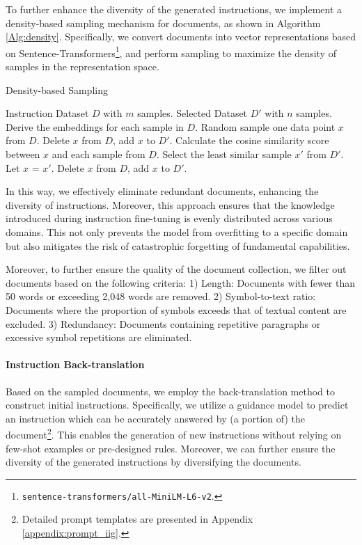 To further enhance the diversity of the generated instructions, we implement a density-based sampling mechanism for documents, as shown in Algorithm \ref{Alg:density}. Specifically, we convert documents into vector representations based on Sentence-Transformers\footnote{\texttt{sentence-transformers/all-MiniLM-L6-v2}.}, and perform sampling to maximize the density of samples in the representation space.

\begin{algorithm}[t]
  \renewcommand{\algorithmicrequire}{\textbf{Input:}}
  \renewcommand{\algorithmicensure}{\textbf{Output:}}
  \caption{Density-based Sampling}
  \label{alg:1}
  \begin{algorithmic}[1]
      \REQUIRE Instruction Dataset $D$ with $m$ samples.
      \ENSURE Selected Dataset $D'$ with $n$ samples.
      \STATE Derive the embeddings for each sample in $D$.
      \STATE Random sample one data point $x$ from $D$.
      \STATE Delete $x$ from $D$, add $x$ to $D'$.
          \STATE Calculate the cosine similarity score between $x$ and each sample from $D$.
          \STATE Select the least similar sample $x'$ from $D'$.
          \STATE Let $x$ = $x'$.
          \STATE Delete $x$ from $D$, add $x$ to $D'$. 
      \ENDFOR
  \end{algorithmic}
\label{Alg:density}
\end{algorithm}

In this way, we effectively eliminate redundant documents, enhancing the diversity of instructions. Moreover, this approach ensures that the knowledge introduced during instruction fine-tuning is evenly distributed across various domains. This not only prevents the model from overfitting to a specific domain but also mitigates the risk of catastrophic forgetting of fundamental capabilities.

Moreover, to further ensure the quality of the document collection, we filter out documents based on the following criteria: 1) Length: Documents with fewer than 50 words or exceeding 2,048 words are removed. 2) Symbol-to-text ratio: Documents where the proportion of symbols exceeds that of textual content are excluded. 3) Redundancy: Documents containing repetitive paragraphs or excessive symbol repetitions are eliminated.

\paragraph{Instruction Back-translation}
Based on the sampled documents, we employ the back-translation method to construct initial instructions.
Specifically, we utilize a guidance model to predict an instruction which can be accurately answered by (a portion of) the document\footnote{Detailed prompt templates are presented in Appendix \ref{appendix:prompt_iig}.}. This enables the generation of new instructions without relying on few-shot examples or pre-designed rules. Moreover, we can further ensure the diversity of the generated instructions by diversifying the documents.

